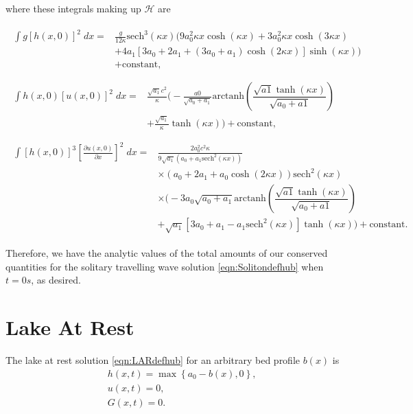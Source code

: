 where these integrals making up $\mathcal{H}$ are

\begin{align*}
\begin{split}
\int g\left[h(x,0)\right]^2 \; dx ={}& \frac{g}{12 \kappa }\text{sech}^3\left(\kappa x\right) \Bigg(9a_0^2 \kappa x \cosh\left(\kappa x\right) + 3 a_0^2 \kappa x \cosh\left(3\kappa x\right) \\ &+ 4 a_1 \left[3a_0 + 2 a_1 + \left(3a_0 + a_1\right)\cosh\left(2\kappa x\right)\right] \sinh\left(\kappa x\right)\Bigg) \\ &+ \text{constant},
\end{split}\\ \\
\begin{split}
\int h(x,0)\left[u(x,0)\right]^2 \; dx = {}& \frac{\sqrt{a_1}c^2}{\kappa} \Bigg( -\frac{a0}{\sqrt{a_0 + a_1}} \text{arctanh}\left(\dfrac{\sqrt{a1} \tanh\left(\kappa x\right)}{\sqrt{a_0 + a1}}\right)\\ &+ \frac{\sqrt{a_1}}{\kappa}\tanh\left(\kappa x\right)\Bigg)  + \text{constant},
\end{split} 
\\ \\
\begin{split}
\int \left[h(x,0)\right]^3 \left[\frac{\partial u(x,0)}{\partial x}\right]^2 \; dx = {}& \frac{2a_0^2c^2 \kappa }{9 \sqrt{a_1} \left(a_0 + a_1\text{sech}^2\left(\kappa x \right) \right)}   \\ &\times\left(a_0 + 2a_1 + a_0 \cosh\left(2\kappa x\right) \right) \text{sech}^2\left(\kappa x\right) \\&\times \Bigg(-3 a_0 \sqrt{a_0 + a_1}\text{arctanh}\left(\dfrac{\sqrt{a1} \tanh\left(\kappa x\right)}{\sqrt{a_0 + a1}}\right)  \\ &+ \sqrt{a_1}\left[3a_0 + a_1 - a_1\text{sech}^2\left(\kappa x\right)\right]\tanh(\kappa x) \Bigg)+ \text{constant}.
\end{split}
\end{align*}

Therefore, we have the analytic values of the total amounts of our conserved quantities for the solitary travelling wave solution \eqref{eqn:Solitondefhub} when $t=0s$, as desired.


\section{Lake At Rest}
The lake at rest solution \eqref{eqn:LARdefhub} for an arbitrary bed profile $b(x)$ is
	\begin{align*}
	&h(x,t) = \max\left\lbrace a_0 - b(x), 0 \right\rbrace, \\
	&u(x,t) = 0 , \\
	&G(x,t) = 0 .
	\end{align*}

